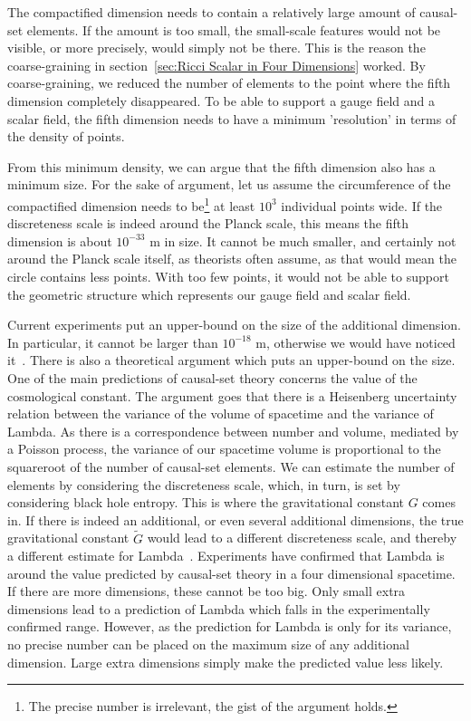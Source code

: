 \documentclass[a4paper,12pt]{article}
\numberwithin{equation}{section}
\begin{document}
The compactified dimension needs to contain a relatively large amount of causal-set elements. If the amount is too small, the small-scale features would not be visible, or more precisely, would simply not be there. This is the reason the coarse-graining in section~\ref{sec:Ricci Scalar in Four Dimensions} worked. By coarse-graining, we reduced the number of elements to the point where the fifth dimension completely disappeared. To be able to support a gauge field and a scalar field, the fifth dimension needs to have a minimum 'resolution' in terms of the density of points.

From this minimum density, we can argue that the fifth dimension also has a minimum size. For the sake of argument, let us assume the circumference of the compactified dimension needs to be\footnote{The precise number is irrelevant, the gist of the argument holds.} at least $10^3$ individual points wide. If the discreteness scale is indeed around the Planck scale, this means the fifth dimension is about $10^{-33}$ m in size. It cannot be much smaller, and certainly not around the Planck scale itself, as theorists often assume, as that would mean the circle contains less points. With too few points, it would not be able to support the geometric structure which represents our gauge field and scalar field.

Current experiments put an upper-bound on the size of the additional dimension. In particular, it cannot be larger than $10^{-18}$ m, otherwise we would have noticed it~\cite{Overduin1997}. There is also a theoretical argument which puts an upper-bound on the size. One of the main predictions of causal-set theory concerns the value of the cosmological constant. The argument goes that there is a Heisenberg uncertainty relation between the variance of the volume of spacetime and the variance of Lambda. As there is a correspondence between number and volume, mediated by a Poisson process, the variance of our spacetime volume is proportional to the squareroot of the number of causal-set elements. We can estimate the number of elements by considering the discreteness scale, which, in turn, is set by considering black hole entropy. This is where the gravitational constant $G$ comes in. If there is indeed an additional, or even several additional dimensions, the true gravitational constant $\tilde{G}$ would lead to a different discreteness scale, and thereby a different estimate for Lambda~\cite{Sorkin2005}. Experiments have confirmed that Lambda is around the value predicted by causal-set theory in a four dimensional spacetime. If there are more dimensions, these cannot be too big. Only small extra dimensions lead to a prediction of Lambda which falls in the experimentally confirmed range. However, as the prediction for Lambda is only for its variance, no precise number can be placed on the maximum size of any additional dimension. Large extra dimensions simply make the predicted value less likely.
\end{document}
